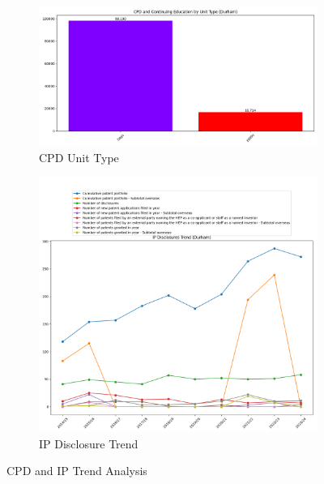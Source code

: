 \documentclass[journal,onecolumn, 10pt,draftclsnofoot]{IEEEtran}
\begin{document}
\begin{figure}[h]
    \centering
    \begin{subfigure}[b]{0.48\textwidth}
        \centering
        \includegraphics[width=\linewidth]{Fig/figure12.cpd_unit_type.png}
        \caption{CPD Unit Type}
        \label{fig:cpd-unit-type}
    \end{subfigure}
    \hfill
    \begin{subfigure}[b]{0.48\textwidth}
        \centering
        \includegraphics[width=\linewidth]{Fig/figure19.ip_disclosure_trend.png}
        \caption{IP Disclosure Trend}
        \label{fig:ip-disclosure-trend}
    \end{subfigure}
    \vspace{0.6cm}
    \caption{CPD and IP Trend Analysis}
    \label{fig:cpd-ip-trend}
\end{figure}
\end{document}
